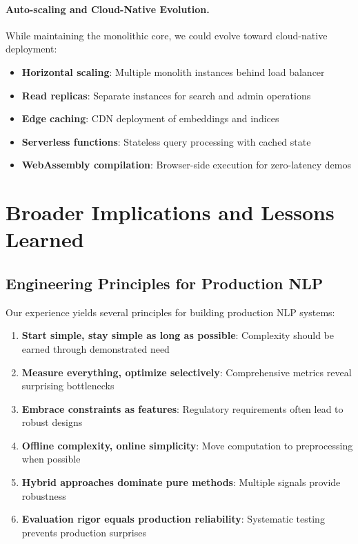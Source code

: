 \paragraph{Auto-scaling and Cloud-Native Evolution.} While maintaining the monolithic core, we could evolve toward cloud-native deployment:
\begin{itemize}[leftmargin=*,itemsep=2pt,topsep=2pt]
 \item \textbf{Horizontal scaling}: Multiple monolith instances behind load balancer
 \item \textbf{Read replicas}: Separate instances for search and admin operations
 \item \textbf{Edge caching}: CDN deployment of embeddings and indices
 \item \textbf{Serverless functions}: Stateless query processing with cached state
 \item \textbf{WebAssembly compilation}: Browser-side execution for zero-latency demos
\end{itemize}

\section{Broader Implications and Lessons Learned}

\subsection{Engineering Principles for Production NLP}

Our experience yields several principles for building production NLP systems:

\begin{enumerate}[leftmargin=*,itemsep=2pt,topsep=2pt]
 \item \textbf{Start simple, stay simple as long as possible}: Complexity should be earned through demonstrated need
 \item \textbf{Measure everything, optimize selectively}: Comprehensive metrics reveal surprising bottlenecks
 \item \textbf{Embrace constraints as features}: Regulatory requirements often lead to robust designs
 \item \textbf{Offline complexity, online simplicity}: Move computation to preprocessing when possible
 \item \textbf{Hybrid approaches dominate pure methods}: Multiple signals provide robustness
 \item \textbf{Evaluation rigor equals production reliability}: Systematic testing prevents production surprises
\end{enumerate}

